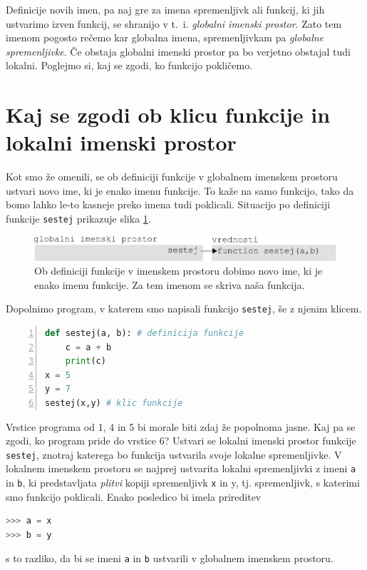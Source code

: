 Definicije novih imen, pa naj gre za imena spremenljivk ali funkcij, ki jih ustvarimo izven funkcij, se shranijo v t.~i. \emph{globalni imenski prostor}. Zato tem imenom pogosto rečemo kar globalna imena, spremenljivkam pa \emph{globalne spremenljivke}. Če obstaja globalni imenski prostor pa bo verjetno obstajal tudi lokalni. Poglejmo si, kaj se zgodi, ko funkcijo pokličemo.

\section{Kaj se zgodi ob klicu funkcije in lokalni imenski prostor}
Kot smo že omenili, se ob definiciji funkcije v globalnem imenskem prostoru ustvari novo ime, ki je enako imenu funkcije. To kaže na samo funkcijo, tako da bomo lahko le-to kasneje preko imena tudi poklicali. Situacijo po definiciji funkcije \texttt{sestej} prikazuje slika \ref{img:imenski_prostor_2}. \begin{figure}
    \includegraphics[width=\linewidth]{img/imenski_prostor_2.pdf}
    \caption{Ob definiciji funkcije v imenskem prostoru dobimo novo ime, ki je enako imenu funkcije. Za tem imenom se skriva naša funkcija.}
    \label{img:imenski_prostor_2}
\end{figure}

Dopolnimo program, v katerem smo napisali funkcijo \texttt{sestej}, še z njenim klicem.
\begin{lstlisting}[language=Python,numbers=left]
def sestej(a, b): # definicija funkcije
    c = a + b
    print(c)
x = 5
y = 7
sestej(x,y) # klic funkcije
\end{lstlisting}
Vrstice programa od 1, 4 in 5 bi morale biti zdaj že popolnoma jasne. Kaj pa se zgodi, ko program pride do vrstice 6? Ustvari se lokalni imenski prostor funkcije \texttt{sestej}, znotraj katerega bo funkcija ustvarila svoje lokalne spremenljivke. V lokalnem imenskem prostoru se najprej ustvarita lokalni spremenljivki z imeni \texttt{a} in \texttt{b}, ki predstavljata \emph{plitvi} kopiji spremenljivk \texttt{x} in {y}, tj. spremenljivk, s katerimi smo funkcijo poklicali. Enako posledico bi imela prireditev
\begin{lstlisting}[language=Python]
>>> a = x
>>> b = y
\end{lstlisting}
s to razliko, da bi se imeni \texttt{a} in \texttt{b} ustvarili v globalnem imenskem prostoru.

